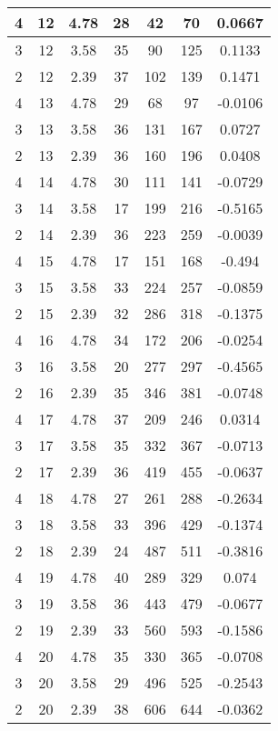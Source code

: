 \documentclass[letterpaper, 12pt]{article}
\begin{document}
\begin{longtable}{|c|c|c|c|c|c|c|}
\hline
4 & 12 & 4.78 & 28 & 42 & 70 & 0.0667 \\
\hline
3 & 12 & 3.58 & 35 & 90 & 125 & 0.1133 \\
\hline
2 & 12 & 2.39 & 37 & 102 & 139 & 0.1471 \\
\hline
4 & 13 & 4.78 & 29 & 68 & 97 & -0.0106 \\
\hline
3 & 13 & 3.58 & 36 & 131 & 167 & 0.0727 \\
\hline
2 & 13 & 2.39 & 36 & 160 & 196 & 0.0408 \\
\hline
4 & 14 & 4.78 & 30 & 111 & 141 & -0.0729 \\
\hline
3 & 14 & 3.58 & 17 & 199 & 216 & -0.5165 \\
\hline
2 & 14 & 2.39 & 36 & 223 & 259 & -0.0039 \\
\hline
4 & 15 & 4.78 & 17 & 151 & 168 & -0.494 \\
\hline
3 & 15 & 3.58 & 33 & 224 & 257 & -0.0859 \\
\hline
2 & 15 & 2.39 & 32 & 286 & 318 & -0.1375 \\
\hline
4 & 16 & 4.78 & 34 & 172 & 206 & -0.0254 \\
\hline
3 & 16 & 3.58 & 20 & 277 & 297 & -0.4565 \\
\hline
2 & 16 & 2.39 & 35 & 346 & 381 & -0.0748 \\
\hline
4 & 17 & 4.78 & 37 & 209 & 246 & 0.0314 \\
\hline
3 & 17 & 3.58 & 35 & 332 & 367 & -0.0713 \\
\hline
2 & 17 & 2.39 & 36 & 419 & 455 & -0.0637 \\
\hline
4 & 18 & 4.78 & 27 & 261 & 288 & -0.2634 \\
\hline
3 & 18 & 3.58 & 33 & 396 & 429 & -0.1374 \\
\hline
2 & 18 & 2.39 & 24 & 487 & 511 & -0.3816 \\
\hline
4 & 19 & 4.78 & 40 & 289 & 329 & 0.074 \\
\hline
3 & 19 & 3.58 & 36 & 443 & 479 & -0.0677 \\
\hline
2 & 19 & 2.39 & 33 & 560 & 593 & -0.1586 \\
\hline
4 & 20 & 4.78 & 35 & 330 & 365 & -0.0708 \\
\hline
3 & 20 & 3.58 & 29 & 496 & 525 & -0.2543 \\
\hline
2 & 20 & 2.39 & 38 & 606 & 644 & -0.0362 \\
\hline
\end{longtable}
\end{document}
